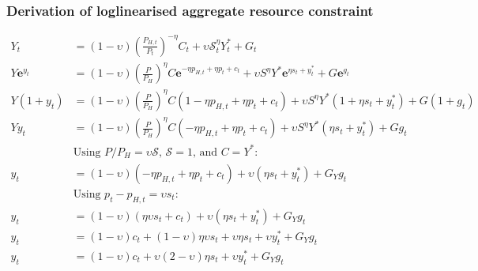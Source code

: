 \subsubsection*{Derivation of loglinearised aggregate resource constraint}
\begin{align}\label{eq:appendix_log_rc_beginning}
    Y_t &= (1-\upsilon)\left(\frac{P_{H,t}}{P_t}\right)^{-\eta}C_t + \upsilon \mathcal{S}_t^{\eta}Y_t^* + G_t\\
    Y \mathbf{e}^{y_t} &= (1-\upsilon)\left(\frac{P}{P_{H}}\right)^{\eta}C \mathbf{e}^{-\eta p_{H,t} + \eta p_t + c_t}+ \upsilon S^{\eta} Y^* \mathbf{e}^{\eta s_t + y^*_t} + G \mathbf{e}^{g_t}\\
    Y ({1+y_t}) &= (1-\upsilon)\left(\frac{P}{P_{H}}\right)^{\eta}C ({1 -\eta p_{H,t} + \eta p_t + c_t})+ \upsilon S^{\eta} Y^* ({1 + \eta s_t + y^*_t}) + G ({1+ g_t})\\
    Y y_t &= (1-\upsilon)\left(\frac{P}{P_{H}}\right)^{\eta}C ({-\eta p_{H,t} + \eta p_t + c_t})+ \upsilon S^{\eta} Y^* ({\eta s_t + y^*_t}) + G g_t\\
    &\text{Using $P/P_H = \mathcal{\upsilon S}$, $\mathcal{S} = 1$, and $C=Y^*$}:\\
    y_t &= (1-\upsilon)({-\eta p_{H,t} + \eta p_t + c_t})+ \upsilon ({\eta s_t + y^*_t}) + G_Y g_t\\
    &\text{Using $p_t - p_{H,t} = \upsilon s_t$}:\\
    y_t &= (1-\upsilon)({\eta \upsilon s_t + c_t})+ \upsilon ({\eta s_t + y^*_t}) + G_Y g_t\\
    y_t &= (1-\upsilon)c_t + (1-\upsilon) \eta \upsilon s_t + \upsilon {\eta s_t} + \upsilon y^*_t + G_Y g_t\\
    y_t &= (1-\upsilon)c_t + \upsilon (2-\upsilon)\eta s_t + \upsilon y^*_t + G_Y g_t \label{eq:appendix_log_rc_end}
\end{align}
\newpage